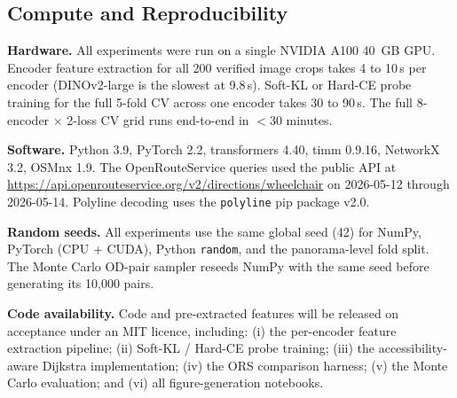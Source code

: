 \documentclass{article}
\begin{document}
\subsection{Compute and Reproducibility}

\textbf{Hardware.} All experiments were run on a single NVIDIA A100 40~GB GPU. Encoder feature extraction for all 200 verified image crops takes 4 to 10\,s per encoder (DINOv2-large is the slowest at 9.8\,s). Soft-KL or Hard-CE probe training for the full 5-fold CV across one encoder takes 30 to 90\,s. The full 8-encoder $\times$ 2-loss CV grid runs end-to-end in $<30$ minutes.

\textbf{Software.} Python 3.9, PyTorch 2.2, transformers 4.40, timm 0.9.16, NetworkX 3.2, OSMnx 1.9. The OpenRouteService queries used the public API at \url{https://api.openrouteservice.org/v2/directions/wheelchair} on 2026-05-12 through 2026-05-14. Polyline decoding uses the \texttt{polyline} pip package v2.0.

\textbf{Random seeds.} All experiments use the same global seed (42) for NumPy, PyTorch (CPU + CUDA), Python \texttt{random}, and the panorama-level fold split. The Monte Carlo OD-pair sampler reseeds NumPy with the same seed before generating its 10{,}000 pairs.

\textbf{Code availability.} Code and pre-extracted features will be released on acceptance under an MIT licence, including: (i) the per-encoder feature extraction pipeline; (ii) Soft-KL / Hard-CE probe training; (iii) the accessibility-aware Dijkstra implementation; (iv) the ORS comparison harness; (v) the Monte Carlo evaluation; and (vi) all figure-generation notebooks.
\end{document}
